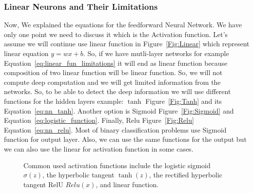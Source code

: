 \subsubsection{Linear Neurons and Their Limitations}

Now, We explained the equations for the feedforward Neural Network. We have only one point we need to discuss it which is the Activation function. Let's assume we will continue use linear function in Figure~\ref{Fig:Linear} which represent linear equation  $y= w x + b$. So, if we have mutli-layer networks for example Equation~\eqref{eq:linear_fun_limitations} it will end as linear function because composition of two linear function will be linear function. So, we will not compute deep computation and we will get limited information from the networks. So, to be able to detect the deep information we will use different functions for the hidden layers example: $\tanh$ Figure~\ref{Fig:Tanh} and its Equation~\eqref{eq:nn_tanh}. Another option is Sigmoid Figure~\ref{Fig:Sigmoid} and  Equation~\eqref{eq:logistic_function}. Finally, Relu Figure~\ref{Fig:Relu} Equation~\eqref{eq:nn_relu}. Most of binary classification problems use Sigmoid function for output layer. Also, we can use the same functions for the output but we can also use the linear for activation function in some cases.%
\begin{figure}[!t]
  \centering
%
%          
%
          \caption{Common used activation functions include the logistic sigmoid $\sigma(z)$, the hyperbolic tangent $\tanh(z)$, the rectified hyperbolic tangent RelU $Relu(x)$, and linear function.}
\end{figure}%

